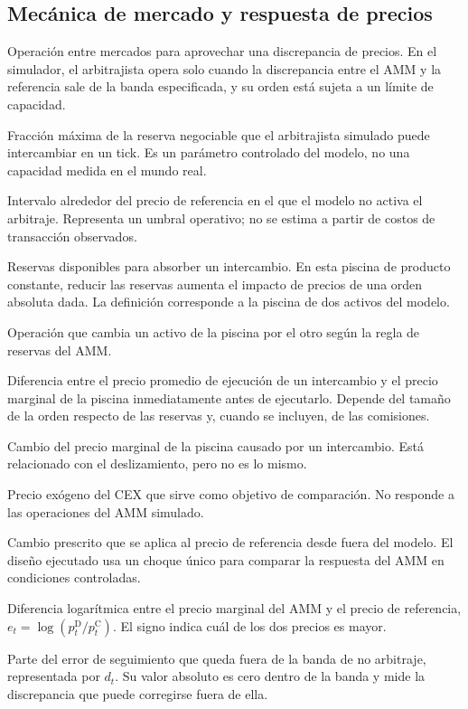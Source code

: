 \subsection*{Mecánica de mercado y respuesta de precios}
\begin{description}[style=unboxed,leftmargin=0pt,labelwidth=0pt,labelsep=0.5em,itemsep=0.1em]
  \item[Arbitraje:] Operación entre mercados para aprovechar una discrepancia de precios. En el simulador, el arbitrajista opera solo cuando la discrepancia entre el AMM y la referencia sale de la banda especificada, y su orden está sujeta a un límite de capacidad.
  \item[Capacidad de arbitraje:] Fracción máxima de la reserva negociable que el arbitrajista simulado puede intercambiar en un tick. Es un parámetro controlado del modelo, no una capacidad medida en el mundo real.
  \item[Banda de no arbitraje:] Intervalo alrededor del precio de referencia en el que el modelo no activa el arbitraje. Representa un umbral operativo; no se estima a partir de costos de transacción observados.
  \item[Liquidez y profundidad:] Reservas disponibles para absorber un intercambio. En esta piscina de producto constante, reducir las reservas aumenta el impacto de precios de una orden absoluta dada. La definición corresponde a la piscina de dos activos del modelo.
  \item[Intercambio (swap):] Operación que cambia un activo de la piscina por el otro según la regla de reservas del AMM.
  \item[Deslizamiento:] Diferencia entre el precio promedio de ejecución de un intercambio y el precio marginal de la piscina inmediatamente antes de ejecutarlo. Depende del tamaño de la orden respecto de las reservas y, cuando se incluyen, de las comisiones.
  \item[Impacto de precios:] Cambio del precio marginal de la piscina causado por un intercambio. Está relacionado con el deslizamiento, pero no es lo mismo.
  \item[Precio de referencia:] Precio exógeno del CEX que sirve como objetivo de comparación. No responde a las operaciones del AMM simulado.
  \item[Choque exógeno:] Cambio prescrito que se aplica al precio de referencia desde fuera del modelo. El diseño ejecutado usa un choque único para comparar la respuesta del AMM en condiciones controladas.
  \item[Error de seguimiento:] Diferencia logarítmica entre el precio marginal del AMM y el precio de referencia, $e_t=\log(p^{\mathrm D}_t/p^{\mathrm C}_t)$. El signo indica cuál de los dos precios es mayor.
  \item[Exceso de error:] Parte del error de seguimiento que queda fuera de la banda de no arbitraje, representada por $d_t$. Su valor absoluto es cero dentro de la banda y mide la discrepancia que puede corregirse fuera de ella.
\end{description}

